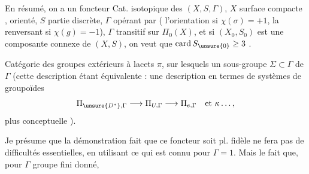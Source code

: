 En résumé, on a un foncteur 
Cat. isotopique des \((X,S,\Gamma)\), \(X\) surface compacte ,
\unsure{\(\Gamma\)} orienté, \(S\) partie discrète, \(\Gamma\) opérant par 
(\inserted{\(\sigma\in\Gamma\)} l'orientation si \(\chi(\sigma)=+1\), la renversant
si \(\chi(g)=-1\)), \(\Gamma\) transitif sur \(\Pi_0(X)\),
 et si \((X_0,S_0)\) est une composante connexe
de \((X,S)\), on veut que 
 \(\operatorname{card} S_{\unsure{0}}\geq 3\) .

\diagram{\begin{tikzcd}[row sep=2.5em]
{} \arrow[d] \\
{}
\end{tikzcd}}

Catégorie des groupes extérieurs à \inserted{\(\Gamma\)-}lacets \(\pi\),
sur lesquels un sous-groupe \(\Sigma\subset\Gamma\) de \(\Gamma\) 
(cette description étant
équivalente : une description en termes
de systèmes de groupoïdes
\[
\Pi_{\unsure{D^*},\Gamma}\longrightarrow\Pi_{U,\Gamma}
\longrightarrow\Pi_{e,\Gamma}\quad\text{et }\kappa\ldots,
\]
plus conceptuelle  ).

 Je présume que la démonstration
 fait que ce foncteur soit pl. fidèle
ne fera pas de difficultés essentielles,
en utilisant ce qui est connu pour
\(\Gamma=1\). Mais le fait que, pour \(\Gamma\) groupe
fini donné, 

